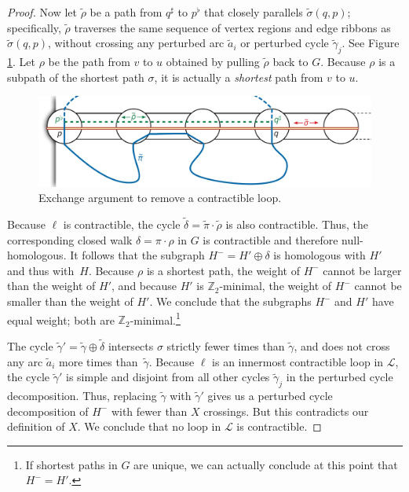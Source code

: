 \documentclass[letterpaper,review]{siamart190516}
\def\Z{\mathbb{Z}}
\begin{document}
\begin{proof}
Now let $\tilde\rho$ be a path from $q^\sharp$ to $p^\flat$ that closely parallels $\tilde\sigma(q,p)$; specifically, $\tilde\rho$ traverses the same sequence of vertex regions and edge ribbons as $\tilde\sigma(q,p)$, without crossing any perturbed arc $\tilde{a}_i$ or perturbed cycle $\tilde\gamma_j$.  See Figure \ref{F:contractible-exchange}.  Let $\rho$ be the path from $v$ to $u$ obtained by pulling $\tilde\rho$ back to $G$.  Because $\rho$ is a subpath of the shortest path $\sigma$, it is actually a \emph{shortest} path from $v$ to $u$.

\begin{figure}[ht]
\centering
\includegraphics[scale=0.4]{Fig/contractible-exchange}
\caption{Exchange argument to remove a contractible loop.}
\label{F:contractible-exchange}
\end{figure}

Because $\ell$ is contractible, the cycle $\tilde\delta = \tilde\pi\cdot\tilde\rho$ is also contractible.  Thus, the corresponding closed walk $\delta = \pi\cdot\rho$ in $G$ is contractible and therefore null-homologous.  It follows that the subgraph $H^- = H'\oplus \delta$ is homologous with $H'$ and thus with~$H$.  Because $\rho$ is a shortest path, the weight of $H^-$ cannot be larger than the weight of $H'$, and because $H'$ is $\Z_2$-minimal, the weight of $H^-$ cannot be smaller than the weight of $H'$.  We conclude that the subgraphs $H^-$ and $H'$ have equal weight; both are $\Z_2$-minimal.\footnote{If shortest paths in $G$ are unique, we can actually conclude at this point that $H^- = H'$.}

The cycle $\tilde\gamma' = \tilde\gamma \oplus \tilde\delta$ intersects $\sigma$ strictly fewer times than $\tilde\gamma$, and does not cross any arc $\tilde{a}_i$ more times than~$\tilde\gamma$.  Because $\ell$ is an innermost contractible loop in $\mathcal{L}$, the cycle $\tilde\gamma'$ is simple and disjoint from all other cycles $\tilde\gamma_j$ in the perturbed cycle decomposition.  Thus, replacing $\tilde\gamma$ with $\tilde\gamma'$ gives us a perturbed cycle decomposition of $H^-$ with fewer than $X$ crossings.  But this contradicts our definition of $X$.  We conclude that no loop in $\mathcal{L}$ is contractible.


\end{proof}
\end{document}
